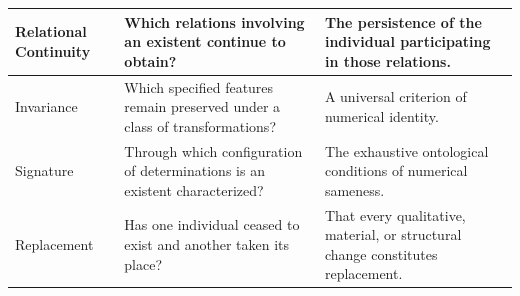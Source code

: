 \begin{table}[htbp]
\begin{tabular}{|p{}|p{}|p{}|}
Relational Continuity
&
Which relations involving an existent continue to obtain?
&
The persistence of the individual participating in those relations.
\\
\hline

Invariance
&
Which specified features remain preserved under a class of transformations?
&
A universal criterion of numerical identity.
\\
\hline

Signature
&
Through which configuration of determinations is an existent characterized?
&
The exhaustive ontological conditions of numerical sameness.
\\
\hline

Replacement
&
Has one individual ceased to exist and another taken its place?
&
That every qualitative, material, or structural change constitutes replacement.
\\
\hline

\end{tabular}
\end{table}


